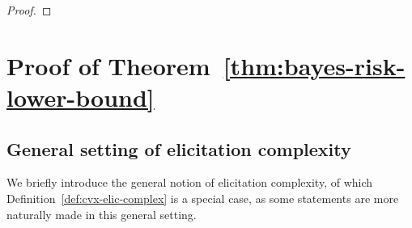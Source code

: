 \documentclass[anon,12pt]{colt2021} %
\newcommand{\reals}{\mathbb{R}}
\newcommand{\simplex}{\Delta_\Y}
\newcommand{\prop}[2][\mathcal{P}]{\mathrm{prop}_{#1}[#2]}
\newcommand{\R}{\mathcal{R}}
\newcommand{\Sc}{\mathcal{S}}  %
\newcommand{\Y}{\mathcal{Y}}
\begin{document}
\begin{proof}
\end{proof}

\section{Proof of Theorem~\ref{thm:bayes-risk-lower-bound}}\label{app:pf-bayesrisklowerbound}

\newcommand{\EL}{\mathcal{E}}
\newcommand{\defeq}{:=}
\newcommand{\conv}{\mathrm{conv}}

\subsection{General setting of elicitation complexity}

We briefly introduce the general notion of elicitation complexity, of which Definition~\ref{def:cvx-elic-complex} is a special case, as some statements are more naturally made in this general setting.
\end{document}
